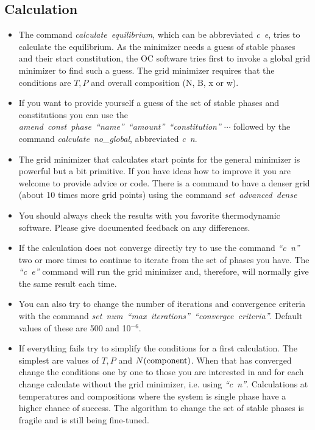 \documentclass[12pt]{article}
\begin{document}
\subsection{Calculation}

\begin{itemize}
\item The command {\em calculate~equilibrium}, which can be
  abbreviated {\em c~e}, tries to calculate the equilibrium.  As the
  minimizer needs a guess of stable phases and their start
  constitution, the OC software tries first to invoke a global grid
  minimizer to find such a guess.  The grid minimizer requires that
  the conditions are $T, P$ and overall composition (N, B, x or w).

\item If you want to provide yourself a guess of the set of stable
  phases and constitutions you can use the {\em
    amend~const~phase~``name''~``amount''~``constitution'' $\cdots$}
  followed by the command {\em calculate~no\_global}, abbreviated {\em
    c~n}.

\item The grid minimizer that calculates start points for the general
  minimizer is powerful but a bit primitive.  If you have ideas how to
  improve it you are welcome to provide advice or code.  There is
  a command to have a denser grid (about 10 times more grid points) using
  the command {\em set~advanced~dense}

\item You should always check the results with you favorite
  thermodynamic software.  Please give documented feedback on any
  differences.

\item If the calculation does not converge directly try to use the
  command {\em ``c~n''} two or more times to continue to iterate from
  the set of phases you have.  The {\em ``c~e''} command will run the
  grid minimizer and, therefore, will normally give the same result
  each time.

\item You can also try to change the number of iterations and
  convergence criteria with the command {\em
    set~num~``max~iterations''~``convergce~criteria''}.  Default
  values of these are 500 and 10$^{-6}$.

\item If everything fails try to simplify the conditions for a first
  calculation.  The simplest are values of $T, P$ and $N(\rm
  component)$. When that has converged change the conditions one by
  one to those you are interested in and for each change calculate
  without the grid minimizer, i.e.  using {\em ``c~n''}.  Calculations
  at temperatures and compositions where the system is single phase
  have a higher chance of success.  The algorithm to change the set of
  stable phases is fragile and is still being fine-tuned.


\end{itemize}
\end{document}
